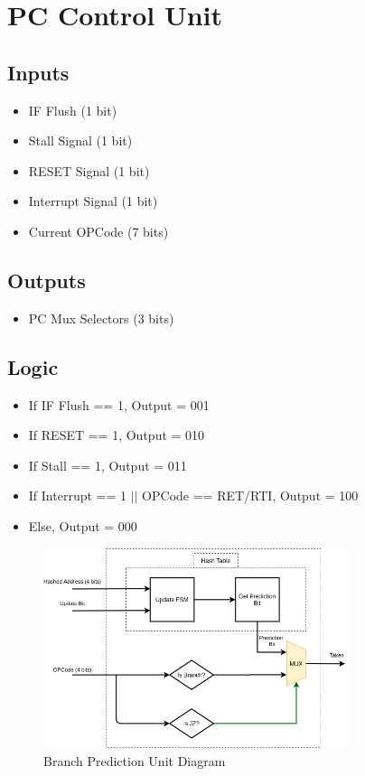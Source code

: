 \documentclass[12pt]{report}
\begin{document}
\section{PC Control Unit}

\subsection{Inputs}
\begin{itemize}
    \item IF Flush (1 bit)
    \item Stall Signal (1 bit)
    \item RESET Signal (1 bit)
    \item Interrupt Signal (1 bit)
    \item Current OPCode (7 bits)
\end{itemize}

\subsection{Outputs}
\begin{itemize}
    \item PC Mux Selectors (3 bits)
\end{itemize}

\subsection{Logic}
\begin{itemize}
    \item If IF Flush == 1, Output = 001
    \item If RESET == 1, Output = 010
    \item If Stall == 1, Output = 011
    \item If Interrupt == 1 $||$ OPCode == RET/RTI, Output = 100
    \item Else, Output = 000
\end{itemize}

\begin{center}
    \begin{figure}[hp]
        \centering
        \includegraphics[width=0.8\textwidth]{bpu}
        \caption{Branch Prediction Unit Diagram}
        \label{fig:bpu}
    \end{figure}
\end{center}
\end{document}
